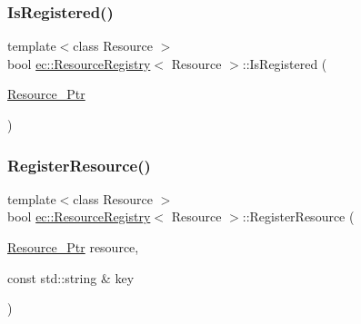\mbox{\label{classec_1_1_resource_registry_a4e1ce3971ba11bf0ebf3e447bb8a3ce7}} 
\subsubsection{\texorpdfstring{Is\+Registered()}{IsRegistered()}\hspace{0.1cm}{\footnotesize\ttfamily [2/2]}}
{\footnotesize\ttfamily template$<$class Resource $>$ \\
bool \mbox{\hyperlink{classec_1_1_resource_registry}{ec\+::\+Resource\+Registry}}$<$ Resource $>$\+::Is\+Registered (\begin{DoxyParamCaption}\item[{\mbox{\hyperlink{classec_1_1_resource_registry_a77cf5381229bff47d251603c783115fe}{Resource\+\_\+\+Ptr}}}]{ }\end{DoxyParamCaption})}

\mbox{\label{classec_1_1_resource_registry_acfe1e9c8129f0f5a9ac76cd2eb1ddd62}} 
\subsubsection{\texorpdfstring{Register\+Resource()}{RegisterResource()}}
{\footnotesize\ttfamily template$<$class Resource $>$ \\
bool \mbox{\hyperlink{classec_1_1_resource_registry}{ec\+::\+Resource\+Registry}}$<$ Resource $>$\+::Register\+Resource (\begin{DoxyParamCaption}\item[{\mbox{\hyperlink{classec_1_1_resource_registry_a77cf5381229bff47d251603c783115fe}{Resource\+\_\+\+Ptr}}}]{resource,  }\item[{const std\+::string \&}]{key }\end{DoxyParamCaption})}

\mbox{\label{classec_1_1_resource_registry_a8abf828823a168161be907d1e867d993}} 
